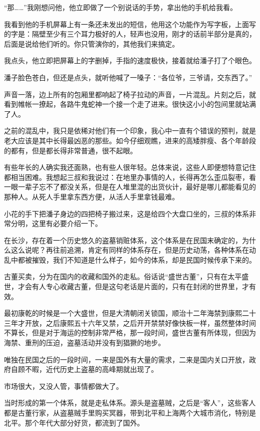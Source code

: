 “那……”我刚想问他，他立即做了一个别说话的手势，拿出他的手机给我看。

我看到他的手机屏幕上有一条还未发出的短信，他用这个功能作为写字板，上面写的字是：隔壁至少有三个耳力极好的人，轻声也没用，刚才的话前半部分是真的，后面是说给他们听的。你只管演你的，其他我们来搞定。

我点头，他立即把屏幕上的字删掉，手指的速度极快，接着就给潘子打了个眼色。

潘子脸色苍白，但还是点头，就听他喊了一嗓子：“各位爷，三爷请，交东西了。”

声音一落，边上所有的包厢里都响起了椅子拉动的声音，一片混乱。片刻之后，就看到帷帐一撩起，各路牛鬼蛇神一个接一个走了进来。很快这小小的包间里就站满了人。

之前的混乱中，我只是依稀对他们有一个印象，我心中一直有个错误的预判，就是老大应该是其中长得最凶恶的那些。如今仔细观瞧，进来的高矮胖瘦、各个年龄段的都有，但是都长得非常普通，很不起眼。

有些年长的人确实我还面熟，也有些人很年轻。总体来说，这些人即便想特意记住都相当困难。我想起三叔和我说过：在地里办事情的人，长得再怎么歪瓜裂枣，看一眼一辈子忘不了都没关系，但是在人堆里混的出货伙计，最好是哪儿都能看见的那种人。从死人手里拿东西方便，从活人手里拿钱最难。

小花的手下把潘子身边的四把椅子搬过来，这是给四个大盘口坐的，三叔的体系非常分明，这里有必要介绍一下。

在长沙，存在着一个历史悠久的盗墓销赃体系，这个体系是在民国末确定的，为什么这么说呢？再往前追溯，肯定有同样的体系存在，但是历史动荡，各种体系在动乱中都被摧毁，我们不知道是什么样子，如今的体系，却是民国时候传承下来的。

古董买卖，分为在国内的收藏和国外的走私。俗话说“盛世古董”，只有在太平盛世，才会有人专心收藏古董，但是这句老话是片面的，只有在封闭的世界里，才有效。

最初康乾的时候是一个大盛世，但是大清朝闭关锁国，顺治十二年海禁到康熙二十三年才开放，之后康熙五十六年又禁，之后开开禁禁好像快板一样，虽然整体时间不算长，但是对于海运的控制非常严格，那一段时间，盛世古董有所体现，但因为海禁、重刑的压迫，盗墓活动并没有到猖獗的地步。

唯独在民国之后的一段时间，一来是国外有大量的需求，二来是国内关口开放，政府自顾不暇，近代历史上盗墓的高峰期就出现了。

市场很大，又没人管，事情都做大了。

当时形成的第一个体系，就是走私体系。源头是盗墓贼，之后是“客人”，这些客人都是古董行家，从盗墓贼手里购买冥器，带到北平和上海两个大城市消化，特别是北平。那个年代大部分好货，都流到了国外。

